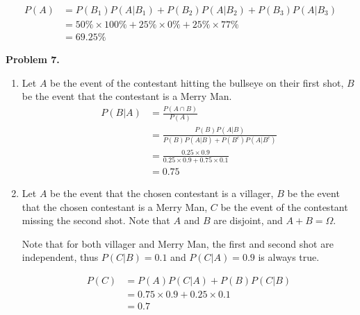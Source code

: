 \documentclass{article}
\begin{document}
\begin{align}
    P(A) & = P(B_1)P(A | B_1) + P(B_2)P(A | B_2) + P(B_3)P(A | B_3) \\
    & = 50\% \times 100\% + 25\% \times 0\% + 25\% \times 77\% \\
    & = 69.25\%
\end{align}
\pagebreak

\textbf{Problem 7.}
\begin{enumerate}[label={(\alph*)}]
    \item 
    Let $A$ be the event of the contestant hitting the bullseye on their first shot, $B$ be the event that the contestant is a Merry Man.
    \begin{align}
        P(B | A) & = \frac{P(A \cap B)}{P(A)} \\
        & = \frac{P(B)P(A|B)}{P(B)P(A | B) + P(B^c)P(A | B^c)} \\
        & = \frac{0.25 \times 0.9}{0.25 \times 0.9 + 0.75 \times 0.1} \\
        & = 0.75
    \end{align}

    \item 
    Let $A$ be the event that the chosen contestant is a villager, $B$ be the event that the chosen contestant is a Merry Man, $C$ be the event of the contestant missing the second shot.
    Note that $A$ and $B$ are disjoint, and $A + B = \Omega$.
    
    Note that for both villager and Merry Man, the first and second shot are independent, thus $P(C | B) = 0.1$ and $P(C | A) = 0.9$ is always true.

    \begin{align}
        P(C) & = P(A)P(C | A) + P(B)P(C | B) \\
        & = 0.75 \times 0.9 + 0.25 \times 0.1 \\ 
        & = 0.7
    \end{align}
\end{enumerate}
\end{document}
